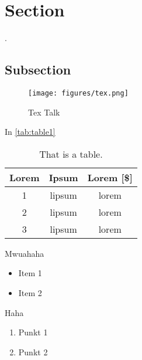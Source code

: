 \documentclass[../main.tex]{subfiles} %
\begin{document}
\section{Section}



\lipsum[2-2] \cite{china_too_many}. 

\subsection{Subsection}


\begin{figure}[H]
    \centering
    \texttt{[image: figures/tex.png]}
    \caption{Tex Talk}
    \label{fig:Tex}
\end{figure}


\lipsum[2-2]

In \autoref{tab:table1}

\newpage
\begin{table}[H]
    \centering
    \caption{That is a table.}
    \begin{tabular}{|c|c|c|}
    \centering
    \textbf{Lorem} & \textbf{Ipsum} & \textbf{Lorem [\$]} \\ \hline \hline
1   & lipsum    & lorem     \\ \hline   
2   & lipsum    & lorem   \\ \hline
3   & lipsum    & lorem  
    \end{tabular}
    \label{tab:table1}
\end{table}

{\Large Mwuahaha} %

\begin{itemize}
    \item Item 1 
    \item Item 2 
    
\end{itemize}

\newpage

{\large Haha}

\begin{enumerate}
    \item Punkt 1
    \item Punkt 2
\end{enumerate}



\lipsum[8]
\end{document}
